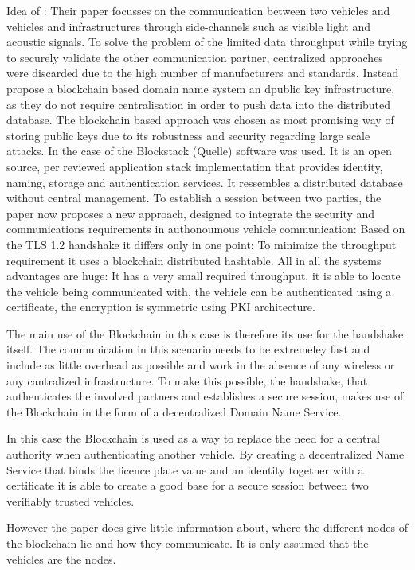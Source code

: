 Idea of \citeauthor{Rowan2017}: Their paper focusses on the communication between two vehicles and vehicles and infrastructures through side-channels such as visible light and acoustic signals. To solve the problem of the limited data throughput while trying to securely validate the other communication partner, centralized approaches were discarded due to the high number of manufacturers and standards. Instead \citeauthor{Rowan2017} propose a blockchain based domain name system an dpublic key infrastructure, as they do not require centralisation in order to push data into the distributed database. 
The blockchain based approach was chosen as most promising way of storing public keys due to its robustness and security regarding large scale attacks. 
In the case of \citeauthor{Rowan2017} the Blockstack (Quelle) software was used. It is an open source, per reviewed application stack implementation that provides identity, naming, storage and authentication services. It ressembles a distributed database without central management.
To establish a session between two parties, the paper now proposes a new approach, designed to integrate the security and communications requirements in authonoumous vehicle communication: Based on the TLS 1.2 handshake it differs only in one point: To minimize the throughput requirement it uses a blockchain distributed hashtable. 
All in all the systems advantages are huge:
It has a very small required throughput, it is able to locate the vehicle being communicated with, the vehicle can be authenticated using a certificate, the encryption is symmetric using PKI architecture.

The main use of the Blockchain in this case is therefore its use for the handshake itself. The communication in this scenario needs to be extremeley fast and include as little overhead as possible and work in the absence of any wireless or any cantralized infrastructure. To make this possible, the handshake, that authenticates the involved partners and establishes a secure session, makes use of the Blockchain in the form of a decentralized Domain Name Service.

In this case the Blockchain is used as a way to replace the need for a central authority when authenticating another vehicle. By creating a decentralized Name Service that binds the licence plate value and an identity together with a certificate it is able to create a good base for a secure session between two verifiably trusted vehicles.

However the paper does give little information about, where the different nodes of the blockchain lie and how they communicate. It is only assumed that the vehicles are the nodes.

